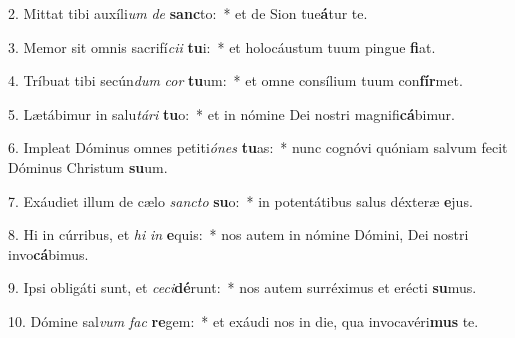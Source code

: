 2. Mittat tibi auxíli\textit{um} \textit{de} \textbf{sanc}to:~*  et de Sion tue\textbf{á}tur te.\

3. Memor sit omnis sacrifí\textit{ci}\textit{i} \textbf{tu}i:~*  et holocáustum tuum pingue \textbf{fi}at.\

4. Tríbuat tibi secún\textit{dum} \textit{cor} \textbf{tu}um:~*  et omne consílium tuum con\textbf{fír}met.\

5. Lætábimur in salu\textit{tá}\textit{ri} \textbf{tu}o:~*  et in nómine Dei nostri magnifi\textbf{cá}bimur.\

6. Impleat Dóminus omnes petiti\textit{ó}\textit{nes} \textbf{tu}as:~*  nunc cognóvi quóniam salvum fecit Dóminus Christum \textbf{su}um.\

7. Exáudiet illum de cælo \textit{sanc}\textit{to} \textbf{su}o:~*  in potentátibus salus déxteræ \textbf{e}jus.\

8. Hi in cúrribus, et \textit{hi} \textit{in} \textbf{e}quis:~*  nos autem in nómine Dómini, Dei nostri invo\textbf{cá}bimus.\

9. Ipsi obligáti sunt, et \textit{ce}\textit{ci}\textbf{dé}runt:~*  nos autem surréximus et erécti \textbf{su}mus.\

10. Dómine sal\textit{vum} \textit{fac} \textbf{re}gem:~*  et exáudi nos in die, qua invocavéri\textbf{mus} te.\


